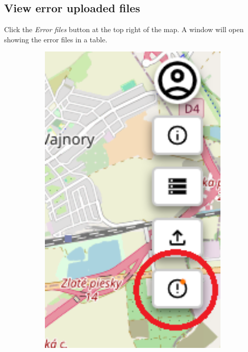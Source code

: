 \subsection{View error uploaded files\label{section:how_to_open_error_files}}
Click the \textit{Error files} button at the top right of the map. A window will open showing the error files in a table.
\begin{figure}[H]
     \centering
     \begin{subfigure}{0.2\textwidth}
         \centering
         \includegraphics[width=1\textwidth]{guide_includes/img/show_errors_tool_button.png}

\end{subfigure}
\end{figure}
